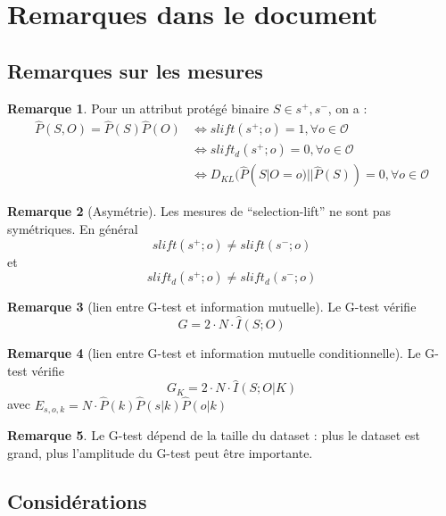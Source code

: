 \documentclass[draft]{article}
\theoremstyle{definition}
\newtheorem{myRem}{Remarque}
\begin{document}
\section{Remarques dans le document}

\subsection{Remarques sur les mesures}

\begin{myRem}
  Pour un attribut protégé binaire $S \in {s^{+}, s^{-}}$, on a :
  \begin{align*}
    \hat{P}(S,O) = \hat{P}(S) \hat{P}(O)
    &\Longleftrightarrow slift(s^{+};o) = 1, \forall o \in \mathcal{O} \\
    &\Longleftrightarrow slift_{d}(s^{+};o) = 0, \forall o \in \mathcal{O} \\
    &\Longleftrightarrow D_{KL}(\hat{P}(S|O = o) || \hat{P}(S)) = 0, \forall o \in \mathcal{O}
  \end{align*}
\end{myRem}

\begin{myRem}[Asymétrie]
  Les mesures de ``selection-lift'' ne sont pas symétriques. En général
  \[
  slift(s^{+};o) \neq slift(s^{-};o)
  \]
  et
  \[
  slift_{d}(s^{+};o) \neq slift_{d}(s^{-};o)
  \]
\end{myRem}

\begin{myRem}[lien entre G-test et information mutuelle]
  Le G-test vérifie
  \[
  G = 2 \cdot N \cdot \hat{I}(S;O)
  \]
\end{myRem}

\begin{myRem}[lien entre G-test et information mutuelle conditionnelle]
  Le G-test vérifie
  \[
  G_{K} = 2 \cdot N \cdot \hat{I}(S;O|K)
  \]
  avec $E_{s,o,k} = N \cdot \hat{P}(k) \hat{P}(s|k) \hat{P}(o|k)$
\end{myRem}

\begin{myRem}
  Le G-test dépend de la taille du dataset : plus le dataset est grand, plus l'amplitude du G-test peut être importante.
\end{myRem}

\subsection{Considérations}
\end{document}
